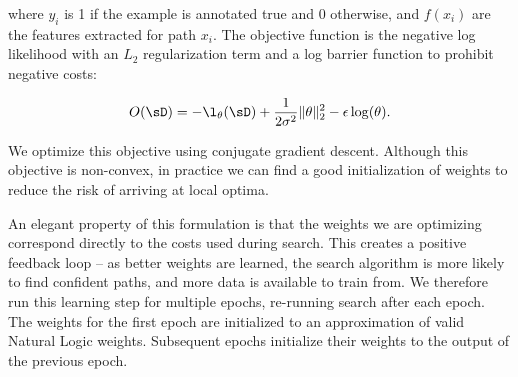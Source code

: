 \noindent where $y_i$ is 1 if the example is annotated true and 0
  otherwise, and $f(x_i)$ are the features extracted for path $x_i$.
The objective function is the negative log likelihood with
  an $L_2$ regularization term and a log barrier function to 
  prohibit negative costs:

\vspace{-1.0em}
\begin{equation*}
O(\sD) = -\l_\theta(\sD) 
  + \frac{1}{2 \sigma^2}\|\theta\|_2^2
  - \epsilon \log(\theta).
\end{equation*}
\vspace{-1.0em}

We optimize this objective using conjugate gradient descent.
Although this objective is non-convex, in practice we can find a good
  initialization of weights to reduce the risk of arriving at
  local optima.

An elegant property of this formulation is that the weights we are
  optimizing correspond directly to the costs used during search.
This creates a positive feedback loop -- as better weights are learned,
  the search algorithm is more likely to find confident paths, and
  more data is available to train from.
We therefore run this learning step for multiple epochs,
  re-running search after each epoch.
The weights for the first epoch are initialized to an approximation
  of valid Natural Logic weights.
Subsequent epochs initialize their weights to the output of the previous
  epoch.






